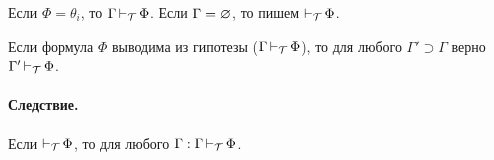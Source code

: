 Если $\Phi = \theta_i$, то  $\Gamma \operatorname{\vdash}_{{\cal T}} \Phi$. Если $\Gamma = \varnothing$, то
пишем  $\operatorname{\vdash}_{{\cal T}} \Phi$.

\begin{theorem}
Если формула $\Phi$ выводима из гипотезы ($\Gamma \operatorname{\vdash}_{{\cal T}} \Phi$), то для
любого $\Gamma' \supset \Gamma$ верно $\Gamma' \operatorname{\vdash}_{{\cal T}} \Phi$.
\end{theorem}

\paragraph*{Следствие.}
Если $\operatorname{\vdash}_{{\cal T}}\Phi$, то для любого $\Gamma: \Gamma \operatorname{\vdash}_{{\cal T}} \Phi$.



